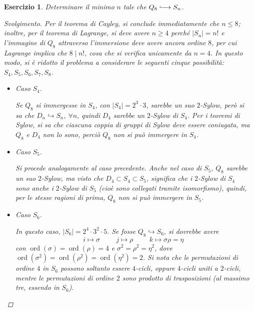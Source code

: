\documentclass[12pt]{scrartcl}
\theoremstyle{style}
\newtheorem{esercizio}{Esercizio}[section]
\newenvironment{svolgimento}{\renewcommand\qedsymbol{$\blacksquare$}\begin{proof}[Svolgimento]}{\end{proof}}
\numberwithin{equation}{subsection}
\newcommand{\longhookrightarrow}{\lhook\joinrel\longrightarrow}
\begin{document}
\begin{esercizio}
Determinare il minimo $n$ tale che $ Q_8 \longhookrightarrow S_n$.
\begin{svolgimento}
	Per il teorema di Cayley, si conclude immediatamente che $n\le 8$; inoltre, per il teorema di Lagrange, si deve avere $n \ge 4$ perch\'e $\lvert S_n \rvert  = n!$ e l'immagine di $Q_8$ attraverso l'immersione deve avere ancora ordine $8$, per cui Lagrange implica che $8  \mid  n!$, cosa che si verifica unicamente da $n = 4$.
	In questo modo, si \`e ridotto il problema a considerare le seguenti cinque possibilit\`a: $S_4,S_5,S_6,S_7,S_8$.
	\begin{itemize}
		\item Caso $S_4$.

			Se $Q_8$ si immergesse in $S_4$, con $\lvert S_4 \rvert =2^3 \cdot 3$, sarebbe un suo $2$-Sylow, per\`o si sa che $D_n \hookrightarrow S_n , \ \forall n$, quindi $D_4$ sarebbe un $2$-Sylow di $S_4$.
			Per i teoremi di Sylow, si sa che ciascuna coppia di gruppi di Sylow deve essere coniugata, ma $Q_8$ e $D_4$ non lo sono, perci\`o $Q_8$ non si pu\`o immergere in $S_4$.
		\item Caso $S_5$.

			Si procede analogamente al caso precedente.
			Anche nel caso di $S_5$, $Q_8$ sarebbe un suo $2$-Sylow, ma visto che $D_4 \subset S_4 \subset S_5$, significa che i $2$-Sylow di $S_4$ sono anche i $2$-Sylow di $S_5$ (cio\`e sono collegati tramite isomorfismo), quindi, per le stesse ragioni di prima, $Q_8$ non si pu\`o immergere in $S_5$.
		\item Caso $S_6$.

			In questo caso, $\lvert S_6 \rvert = 2^4 \cdot 3^2 \cdot 5$.
			Se fosse $Q_8\hookrightarrow S_6$, si dovrebbe avere 
			\[
			i\longmapsto \sigma  \hspace{1cm} j \longmapsto \rho  \hspace{1cm}k \longmapsto \sigma \rho  = \eta
			\] 
			con $\operatorname{ord}(\sigma ) =\operatorname{ord}(\rho ) =4$ e $\sigma ^2 = \rho ^2 = \eta^2$, dove $\operatorname{ord}(\sigma ^2) =\operatorname{ord}(\rho ^2) = \operatorname{ord}(\eta^2) = 2$.
			Si nota che le permutazioni di ordine $4$ in $S_6$ possono soltanto essere $4$-cicli, oppure $4$-cicli uniti a $2$-cicli, mentre le permutazioni di ordine $2$ sono prodotto di trasposizioni (al massimo tre, essendo in $S_6$).


\end{itemize}
\end{svolgimento}
\end{esercizio}
\end{document}
